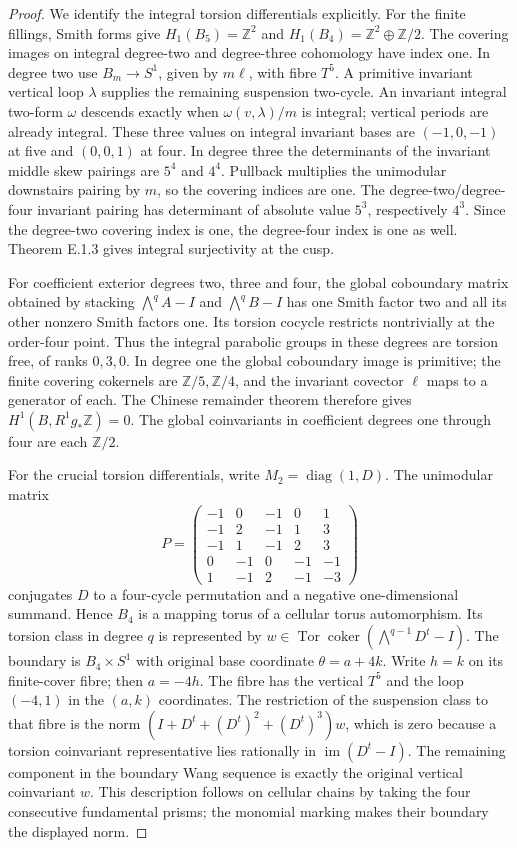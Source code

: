 \begin{proof}
We identify the integral torsion differentials explicitly.
For the finite fillings, Smith forms give
$H_1(B_5)=\mathbb Z^2$ and
$H_1(B_4)=\mathbb Z^2\oplus\mathbb Z/2$.
The covering images on integral degree-two and degree-three
cohomology have index one.  In degree two use
$B_m\to S^1$, given by $m\ell$, with fibre $T^5$.
A primitive invariant vertical loop $\lambda$ supplies the
remaining suspension two-cycle.  An invariant integral
two-form $\omega$ descends exactly when
$\omega(v,\lambda)/m$ is integral; vertical periods are
already integral.  These three values on integral invariant
bases are $(-1,0,-1)$ at five and $(0,0,1)$ at four.
In degree three the determinants of the invariant middle
skew pairings are $5^4$ and $4^4$.  Pullback multiplies the
unimodular downstairs pairing by $m$, so the covering indices
are one.  The degree-two/degree-four invariant pairing has
determinant of absolute value $5^3$, respectively $4^3$.
Since the degree-two covering index is one, the degree-four
index is one as well.  Theorem E.1.3 gives integral
surjectivity at the cusp.

For coefficient exterior degrees two, three and four, the
global coboundary matrix obtained by stacking
$\bigwedge^qA-I$ and $\bigwedge^qB-I$ has one Smith factor
two and all its other nonzero Smith factors one.
Its torsion cocycle restricts nontrivially at the order-four
point.  Thus the integral parabolic groups in these degrees
are torsion free, of ranks $0,3,0$.  In degree one the global
coboundary image is primitive; the finite covering cokernels
are $\mathbb Z/5,\mathbb Z/4$, and the invariant covector
$\ell$ maps to a generator of each.  The Chinese remainder
theorem therefore gives $H^1(B,R^1g_*\mathbb Z)=0$.
The global coinvariants in coefficient degrees one through
four are each $\mathbb Z/2$.

For the crucial torsion differentials, write
$M_2=\operatorname{diag}(1,D)$.  The unimodular matrix
\[
P=\begin{pmatrix}
-1&0&-1&0&1\\-1&2&-1&1&3\\-1&1&-1&2&3\\
0&-1&0&-1&-1\\1&-1&2&-1&-3
\end{pmatrix}
\]
conjugates $D$ to a four-cycle permutation and a negative
one-dimensional summand.  Hence $B_4$ is a mapping torus of
a cellular torus automorphism.  Its torsion class in degree
$q$ is represented by
$w\in\operatorname{Tor}\operatorname{coker}
(\bigwedge^{q-1}D^t-I)$.
The boundary is $B_4\times S^1$ with original base coordinate
$\theta=a+4k$.  Write $h=k$ on its finite-cover fibre; then
$a=-4h$.  The fibre has the vertical $T^5$ and the loop
$(-4,1)$ in the $(a,k)$ coordinates.
The restriction of the suspension class to that fibre is
the norm $(I+D^t+(D^t)^2+(D^t)^3)w$, which is zero because
a torsion coinvariant representative lies rationally in
$\operatorname{im}(D^t-I)$.
The remaining component in the boundary Wang sequence is
exactly the original vertical coinvariant $w$.
This description follows on cellular chains by taking the
four consecutive fundamental prisms; the monomial marking
makes their boundary the displayed norm.


\end{proof}
